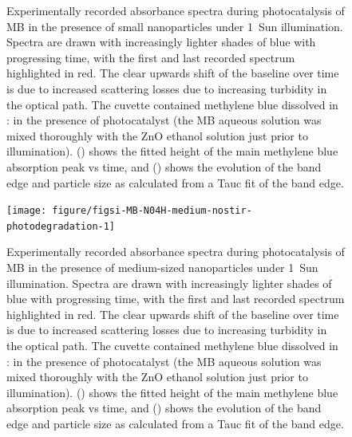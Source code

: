 \documentclass[9pt,twoside,twocolumn]{article}\usepackage{knitr}
\begin{document}
\begin{refsection}
\begin{figure}[tbp]
\begin{knitrout}
{}


\end{knitrout}
{\label{figsi-a:MB-N02A-small-nostir-photodegradation}}
{\label{figsi-b:MB-N02A-small-nostir-photodegradation}}
\caption{Experimentally recorded absorbance spectra during photocatalysis of MB in the presence of small  nanoparticles under 1~Sun illumination. Spectra are drawn with increasingly lighter shades of blue with progressing time, with the first and last recorded spectrum highlighted in red. The clear upwards shift of the baseline over time is due to increased scattering losses due to increasing turbidity in the optical path.
The cuvette contained methylene blue dissolved in : in the presence of  photocatalyst (the MB aqueous solution was mixed thoroughly with the ZnO ethanol solution just prior to illumination).
() shows the fitted height of the main methylene blue absorption peak vs time, and () shows the evolution of the  band edge and particle size as calculated from a Tauc fit of the band edge.}
\label{figsi:MB-N02A-small-nostir-photodegradation}
\end{figure}


\begin{figure}[tbp]
\centering
\begin{knitrout}\footnotesize
{}\color{fgcolor}

{\centering \texttt{[image: figure/figsi-MB-N04H-medium-nostir-photodegradation-1]} 

}


\end{knitrout}
{\label{figsi-a:MB-N04H-medium-nostir-photodegradation}}
{\label{figsi-b:MB-N04H-medium-nostir-photodegradation}}
\caption{Experimentally recorded absorbance spectra during photocatalysis of MB in the presence of medium-sized  nanoparticles under 1~Sun illumination. Spectra are drawn with increasingly lighter shades of blue with progressing time, with the first and last recorded spectrum highlighted in red. The clear upwards shift of the baseline over time is due to increased scattering losses due to increasing turbidity in the optical path.
The cuvette contained methylene blue dissolved in : in the presence of  photocatalyst (the MB aqueous solution was mixed thoroughly with the ZnO ethanol solution just prior to illumination).
() shows the fitted height of the main methylene blue absorption peak vs time, and () shows the evolution of the  band edge and particle size as calculated from a Tauc fit of the band edge.}
\label{figsi:MB-N04H-medium-nostir-photodegradation}
\end{figure}



\end{refsection}
\end{document}
